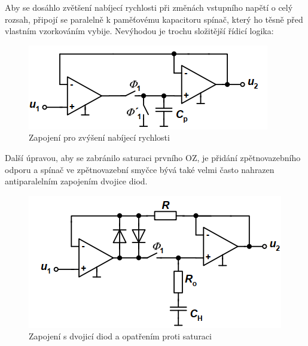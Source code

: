 Aby se dosáhlo zvětšení nabíjecí rychlosti při změnách vstupního napětí o celý rozsah, připojí se paralelně k paměťovému kapacitoru spínač, který ho těsně před vlastním vzorkováním vybije. Nevýhodou je trochu složitější řídicí logika:

\begin{figure}[h]
   \begin{center}
     \includegraphics[scale=0.6]{images/VzorSC2.png}
   \end{center}
   \caption{Zapojení pro zvýšení nabíjecí rychlosti}
\end{figure}
\pagebreak  
Další úpravou, aby se zabránilo saturaci prvního OZ, je přidání zpětnovazebního odporu a spínač ve zpětnovazební smyčce bývá také velmi často nahrazen antiparalelním zapojením dvojice diod. 
\begin{figure}[h]
   \begin{center}
     \includegraphics[scale=0.6]{images/VzorSC3.png}
   \end{center}
   \caption{Zapojení s dvojicí diod a opatřením proti saturaci}
\end{figure}
  
